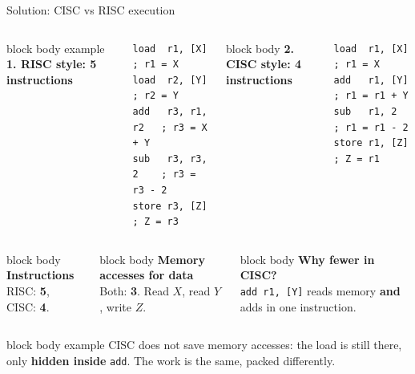 \documentclass[aspectratio=169,10pt]{beamer}
\newcommand{\stepbox}[2]{%
  \begin{beamercolorbox}[rounded=true,sep=0.09cm,wd=\linewidth]{block body}
    \footnotesize\textbf{#1}\\ #2
  \end{beamercolorbox}\vspace{0.06cm}}
\newcommand{\keymsg}[1]{%
  \begin{beamercolorbox}[rounded=true,sep=0.1cm,wd=\textwidth]{block body example}
    \centering\footnotesize #1
  \end{beamercolorbox}}
\begin{document}
\begin{frame}[fragile]{Solution: CISC vs RISC execution}
  \begin{columns}[T,onlytextwidth]
      \begin{beamercolorbox}[rounded=true,sep=0.08cm,wd=\linewidth]{block body example}
        \centering\footnotesize\textbf{1. RISC style: 5 instructions}
      \end{beamercolorbox}
\begin{lstlisting}[style=asm]
load  r1, [X]      ; r1 = X
load  r2, [Y]      ; r2 = Y
add   r3, r1, r2   ; r3 = X + Y
sub   r3, r3, 2    ; r3 = r3 - 2
store r3, [Z]      ; Z = r3
\end{lstlisting}
      \begin{beamercolorbox}[rounded=true,sep=0.08cm,wd=\linewidth]{block body}
        \centering\footnotesize\textbf{2. CISC style: 4 instructions}
      \end{beamercolorbox}
\begin{lstlisting}[style=asm]
load  r1, [X]      ; r1 = X
add   r1, [Y]      ; r1 = r1 + Y
sub   r1, 2        ; r1 = r1 - 2
store r1, [Z]      ; Z = r1
\end{lstlisting}
  \end{columns}
  \vspace{0.4cm}
  \begin{columns}[T,onlytextwidth]
      \stepbox{Instructions}{RISC: \textbf{5}, CISC: \textbf{4}.}
      \stepbox{Memory accesses for data}{Both: \textbf{3}. Read $X$, read $Y$, write $Z$.}
      \stepbox{Why fewer in CISC?}{\texttt{add r1, [Y]} reads memory \textbf{and} adds in one instruction.}
  \end{columns}
  \vfill
  \keymsg{CISC does not save memory accesses: the load is still there, only \textbf{hidden inside} \texttt{add}.
    The work is the same, packed differently.}
\end{frame}
\end{document}
